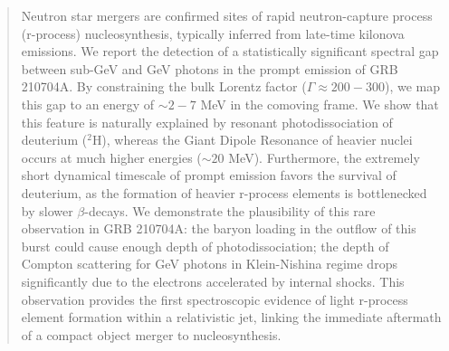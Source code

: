 \documentclass[linenumbers,twocolumn]{aastex631}
\begin{document}
\begin{abstract}
Neutron star mergers are confirmed sites of rapid neutron-capture process (r-process) nucleosynthesis, typically inferred from late-time kilonova emissions. We report the detection of a statistically significant spectral gap between sub-GeV and GeV photons in the prompt emission of GRB 210704A. By constraining the bulk Lorentz factor ($\Gamma \approx 200-300$), we map this gap to an energy of $\sim 2-7$ MeV in the comoving frame. We show that this feature is naturally explained by resonant photodissociation of deuterium ($^2$H), whereas the Giant Dipole Resonance of heavier nuclei occurs at much higher energies ($\sim 20$ MeV). Furthermore, the extremely short dynamical timescale of prompt emission favors the survival of deuterium, as the formation of heavier r-process elements is bottlenecked by slower $\beta$-decays. We demonstrate the plausibility of this rare observation in GRB 210704A: the baryon loading in the outflow of this burst could cause enough depth of photodissociation; the depth of Compton scattering for GeV photons in Klein-Nishina regime drops significantly due to the electrons accelerated by internal shocks. This observation provides the first spectroscopic evidence of light r-process element formation within a relativistic jet, linking the immediate aftermath of a compact object merger to nucleosynthesis.

\end{abstract}



\end{document}

